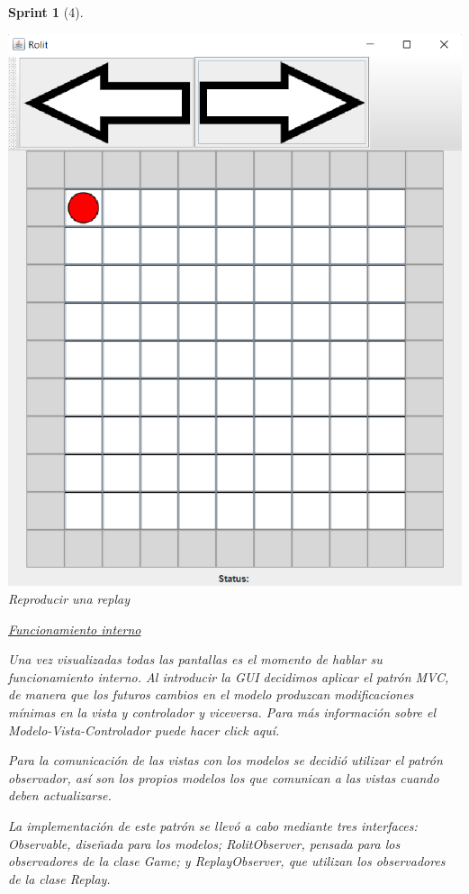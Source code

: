 \documentclass{article}
\theoremstyle{break}
\newtheorem*{sprint}{Sprint}
\begin{document}
\begin{sprint}[4]
\begin{center}
\includegraphics[scale=0.9]{replay-sprint3.png}
Reproducir una \textit{replay}
\end{center}

\underline{Funcionamiento interno}

Una vez visualizadas todas las pantallas es el momento de hablar su funcionamiento interno. Al introducir la GUI decidimos aplicar el patrón MVC, de manera que los futuros cambios en el modelo produzcan modificaciones mínimas en la vista y controlador y viceversa. Para más información sobre el Modelo-Vista-Controlador puede hacer click aquí. %

Para la comunicación de las vistas con los modelos se decidió utilizar el patrón observador, así son los propios modelos los que comunican a las vistas cuando deben actualizarse.

La implementación de este patrón se llevó a cabo mediante tres interfaces: Observable, diseñada para los modelos; RolitObserver, pensada para los observadores de la clase \textit{Game}; y ReplayObserver, que utilizan los observadores de la clase \textit{Replay}.


\end{sprint}
\end{document}
